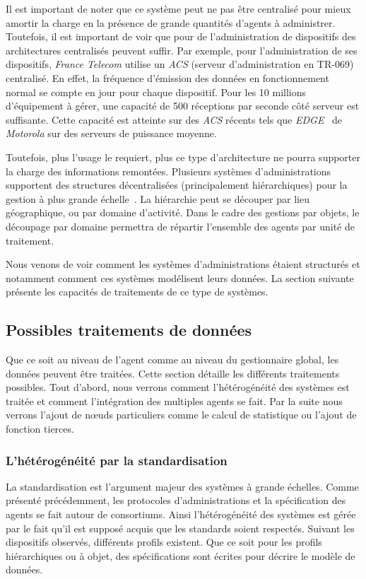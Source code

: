 Il est important de noter que ce système peut ne pas être centralisé pour mieux amortir la charge en la présence de grande quantités d'agents à administrer. Toutefois, il est important de voir que pour de l'administration de dispositifs des architectures centralisés peuvent suffir. Par exemple, pour l'administration de ses dispositifs, \textit{France Telecom} utilise un \textit{ACS} (serveur d'administration en TR-069) centralisé. En effet, la fréquence d'émission des données en fonctionnement normal se compte en jour pour chaque dispositif. Pour les 10 millions d'équipement à gérer, une capacité de 500 réceptions par seconde côté serveur est suffisante. Cette capacité est atteinte sur des \textit{ACS} récents tels que \textit{EDGE}~\cite{Motorola:EDGE} de \textit{Motorola} sur des serveurs de puissance moyenne.

Toutefois, plus l'usage le requiert, plus ce type d'architecture ne pourra supporter la charge des informations remontées. Plusieurs systèmes d'administrations supportent des structures décentralisées (principalement hiérarchiques) pour la gestion à plus grande échelle~\cite{Kessis:management}. La hiérarchie peut se découper par lieu géographique, ou par domaine d'activité. Dans le cadre des gestions par objets, le découpage par domaine permettra de répartir l'ensemble des agents par unité de traitement.

Nous venons de voir comment les systèmes d'administrations étaient structurés et notamment comment ces systèmes modélisent leurs données. La section suivante présente les capacités de traitements de ce type de systèmes.

\subsection{Possibles traitements de données}
Que ce soit au niveau de l'agent comme au niveau du gestionnaire global, les données peuvent être traitées. Cette section détaille les différents traitements possibles. Tout d'abord, nous verrons comment l'hétérogénéité des systèmes est traitée et comment l'intégration des multiples agents se fait. Par la suite nous verrons l'ajout de nœuds particuliers comme le calcul de statistique ou l'ajout de fonction tierces.

\subsubsection{L'hétérogénéité par la standardisation}
La standardisation est l'argument majeur des systèmes à grande échelles. Comme présenté précédemment, les protocoles d'administrations et la spécification des agents se fait autour de consortiums. Ainsi l'hétérogénéité des systèmes est gérée par le fait qu'il est supposé acquis que les standards soient respectés. Suivant les dispositifs observés, différents profils existent. Que ce soit pour les profils hiérarchiques ou à objet, des spécifications sont écrites pour décrire le modèle de données.

